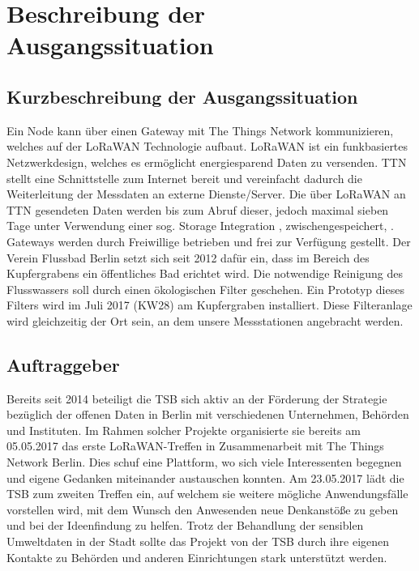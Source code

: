 \section{Beschreibung der Ausgangssituation}

\subsection{Kurzbeschreibung der Ausgangssituation}

Ein Node kann \"uber einen Gateway mit The Things Network kommunizieren, welches auf der LoRaWAN Technologie aufbaut.
LoRaWAN ist ein funkbasiertes Netzwerkdesign, welches es ermöglicht energiesparend Daten zu versenden. TTN stellt eine Schnittstelle zum
Internet bereit und vereinfacht dadurch die Weiterleitung der Messdaten an externe Dienste/Server. Die über LoRaWAN an TTN gesendeten Daten
werden bis zum Abruf dieser, jedoch maximal sieben Tage unter Verwendung einer sog. \glqq Storage Integration \grqq, zwischengespeichert, .
Gateways werden durch Freiwillige betrieben und frei zur Verfügung gestellt.\newline
Der Verein Flussbad Berlin setzt sich seit 2012 dafür ein, dass im Bereich des Kupfergrabens ein öffentliches Bad erichtet wird. Die notwendige Reinigung des Flusswassers soll durch einen ökologischen Filter geschehen. Ein Prototyp dieses Filters wird im Juli 2017 (KW28) am Kupfergraben installiert.
Diese Filteranlage wird gleichzeitig der Ort sein, an dem unsere Messstationen angebracht werden.

\subsection{Auftraggeber}

Bereits seit 2014 beteiligt die TSB sich aktiv an der Förderung der Strategie bezüglich der offenen Daten in Berlin mit verschiedenen Unternehmen, Behörden und Instituten.
Im Rahmen solcher Projekte organisierte sie bereits am 05.05.2017 das erste \glqq LoRaWAN-Treffen\grqq{} in Zusammenarbeit mit The Things Network Berlin. Dies schuf eine Plattform, wo sich viele Interessenten begegnen und eigene Gedanken miteinander austauschen konnten.\newline
Am 23.05.2017 lädt die TSB zum zweiten Treffen ein, auf welchem sie weitere m\"ogliche Anwendungsfälle vorstellen wird, mit dem Wunsch den Anwesenden neue Denkanstöße zu geben und bei der Ideenfindung zu helfen.\newline
Trotz der Behandlung der sensiblen Umweltdaten in der Stadt sollte das Projekt von der TSB durch ihre eigenen Kontakte zu Behörden und anderen Einrichtungen stark unterstützt werden.\newline

